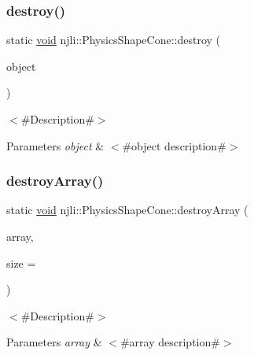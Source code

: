 \subsubsection{\texorpdfstring{destroy()}{destroy()}}
{\footnotesize\ttfamily static \mbox{\hyperlink{_thread_8h_af1e856da2e658414cb2456cb6f7ebc66}{void}} njli\+::\+Physics\+Shape\+Cone\+::destroy (\begin{DoxyParamCaption}\item[{\mbox{\hyperlink{classnjli_1_1_physics_shape_cone}{Physics\+Shape\+Cone}} $\ast$}]{object }\end{DoxyParamCaption})\hspace{0.3cm}{\ttfamily [static]}}

$<$\#\+Description\#$>$


\begin{DoxyParams}{Parameters}
{\em object} & $<$\#object description\#$>$ \\
\hline
\end{DoxyParams}
\mbox{\label{classnjli_1_1_physics_shape_cone_ab9714f1b9af213f9bab289ac60a6c57a}} 
\subsubsection{\texorpdfstring{destroy\+Array()}{destroyArray()}}
{\footnotesize\ttfamily static \mbox{\hyperlink{_thread_8h_af1e856da2e658414cb2456cb6f7ebc66}{void}} njli\+::\+Physics\+Shape\+Cone\+::destroy\+Array (\begin{DoxyParamCaption}\item[{\mbox{\hyperlink{classnjli_1_1_physics_shape_cone}{Physics\+Shape\+Cone}} $\ast$$\ast$}]{array,  }\item[{const \mbox{\hyperlink{_util_8h_a10e94b422ef0c20dcdec20d31a1f5049}{u32}}}]{size = {} }\end{DoxyParamCaption})\hspace{0.3cm}{\ttfamily [static]}}

$<$\#\+Description\#$>$


\begin{DoxyParams}{Parameters}
{\em array} & $<$\#array description\#$>$ \\
\hline
\end{DoxyParams}
\mbox{\label{classnjli_1_1_physics_shape_cone_add550b724bf1cf271ce69b3f2f3de399}} 
